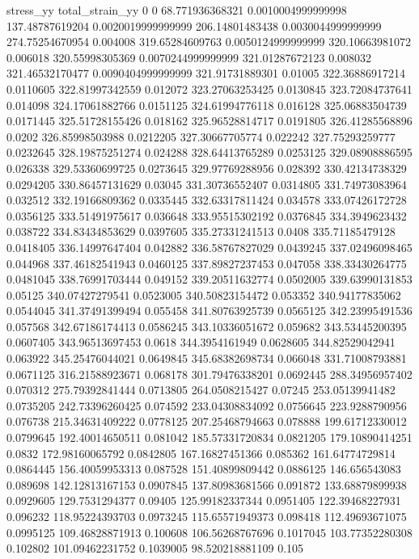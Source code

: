 stress_yy total_strain_yy
0 0
68.771936368321 0.0010004999999998
137.48787619204 0.0020019999999999
206.14801483438 0.0030044999999999
274.75254670954 0.004008
319.65284609763 0.0050124999999999
320.10663981072 0.006018
320.55998305369 0.0070244999999999
321.01287672123 0.008032
321.46532170477 0.0090404999999999
321.91731889301 0.01005
322.36886917214 0.0110605
322.81997342559 0.012072
323.27063253425 0.0130845
323.72084737641 0.014098
324.17061882766 0.0151125
324.61994776118 0.016128
325.06883504739 0.0171445
325.51728155426 0.018162
325.96528814717 0.0191805
326.41285568896 0.0202
326.85998503988 0.0212205
327.30667705774 0.022242
327.75293259777 0.0232645
328.19875251274 0.024288
328.64413765289 0.0253125
329.08908886595 0.026338
329.53360699725 0.0273645
329.97769288956 0.028392
330.42134738329 0.0294205
330.86457131629 0.03045
331.30736552407 0.0314805
331.74973083964 0.032512
332.19166809362 0.0335445
332.63317811424 0.034578
333.07426172728 0.0356125
333.51491975617 0.036648
333.95515302192 0.0376845
334.3949623432 0.038722
334.83434853629 0.0397605
335.27331241513 0.0408
335.71185479128 0.0418405
336.14997647404 0.042882
336.58767827029 0.0439245
337.02496098465 0.044968
337.46182541943 0.0460125
337.89827237453 0.047058
338.33430264775 0.0481045
338.76991703444 0.049152
339.20511632774 0.0502005
339.63990131853 0.05125
340.07427279541 0.0523005
340.50823154472 0.053352
340.94177835062 0.0544045
341.37491399494 0.055458
341.80763925739 0.0565125
342.23995491536 0.057568
342.67186174413 0.0586245
343.10336051672 0.059682
343.53445200395 0.0607405
343.96513697453 0.0618
344.3954161949 0.0628605
344.82529042941 0.063922
345.25476044021 0.0649845
345.68382698734 0.066048
331.71008793881 0.0671125
316.21588923671 0.068178
301.79476338201 0.0692445
288.34956957402 0.070312
275.79392841444 0.0713805
264.0508215427 0.07245
253.05139941482 0.0735205
242.73396260425 0.074592
233.04308834092 0.0756645
223.9288790956 0.076738
215.34631409222 0.0778125
207.25468794663 0.078888
199.61712330012 0.0799645
192.40014650511 0.081042
185.57331720834 0.0821205
179.10890414251 0.0832
172.98160065792 0.0842805
167.16827451366 0.085362
161.64774729814 0.0864445
156.40059953313 0.087528
151.40899809442 0.0886125
146.656543083 0.089698
142.12813167153 0.0907845
137.80983681566 0.091872
133.68879899938 0.0929605
129.7531294377 0.09405
125.99182337344 0.0951405
122.39468227931 0.096232
118.95224393703 0.0973245
115.65571949373 0.098418
112.49693671075 0.0995125
109.46828871913 0.100608
106.56268767696 0.1017045
103.77352280308 0.102802
101.09462231752 0.1039005
98.520218881109 0.105
